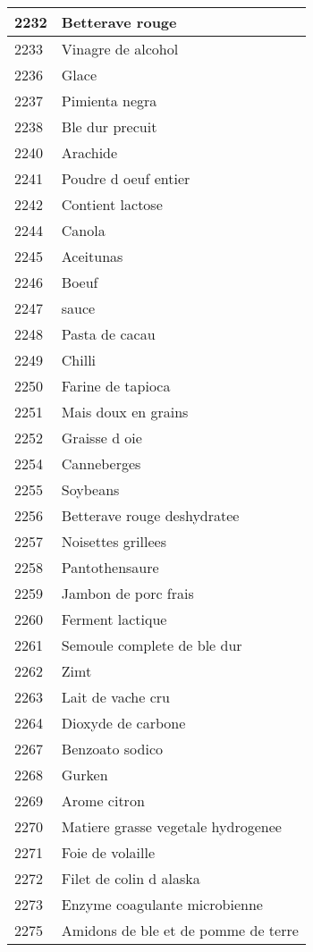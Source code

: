 \begin{longtable}{|l|l|}
2232 & Betterave rouge \\ \hline 
2233 & Vinagre de alcohol \\ \hline 
2236 & Glace \\ \hline 
2237 & Pimienta negra \\ \hline 
2238 & Ble dur precuit \\ \hline 
2240 & Arachide \\ \hline 
2241 & Poudre d oeuf entier \\ \hline 
2242 & Contient lactose \\ \hline 
2244 & Canola \\ \hline 
2245 & Aceitunas \\ \hline 
2246 & Boeuf \\ \hline 
2247 & sauce \\ \hline 
2248 & Pasta de cacau \\ \hline 
2249 & Chilli \\ \hline 
2250 & Farine de tapioca \\ \hline 
2251 & Mais doux en grains \\ \hline 
2252 & Graisse d oie \\ \hline 
2254 & Canneberges \\ \hline 
2255 & Soybeans \\ \hline 
2256 & Betterave rouge deshydratee \\ \hline 
2257 & Noisettes grillees \\ \hline 
2258 & Pantothensaure \\ \hline 
2259 & Jambon de porc frais \\ \hline 
2260 & Ferment lactique \\ \hline 
2261 & Semoule complete de ble dur \\ \hline 
2262 & Zimt \\ \hline 
2263 & Lait de vache cru \\ \hline 
2264 & Dioxyde de carbone \\ \hline 
2267 & Benzoato sodico \\ \hline 
2268 & Gurken \\ \hline 
2269 & Arome citron \\ \hline 
2270 & Matiere grasse vegetale hydrogenee \\ \hline 
2271 & Foie de volaille \\ \hline 
2272 & Filet de colin d alaska \\ \hline 
2273 & Enzyme coagulante microbienne \\ \hline 
2275 & Amidons de ble et de pomme de terre \\ \hline 

\end{longtable}

